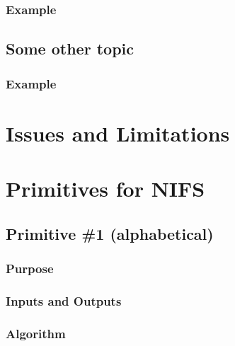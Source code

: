 \documentclass[letterpaper,10pt,english]{sphinxmanual}
\begin{document}
\subsubsection{Example}
\label{NIFS/tipstricks:example}

\subsection{Some other topic}
\label{NIFS/tipstricks:some-other-topic}

\subsubsection{Example}
\label{NIFS/tipstricks:id1}

\section{Issues and Limitations}
\label{NIFS/issueslimitations:nifs-issues-limitations}\label{NIFS/issueslimitations::doc}\label{NIFS/issueslimitations:issues-and-limitations}

\section{Primitives for NIFS}
\label{NIFS/primitives:primitives-for-nifs}\label{NIFS/primitives:nifs-primitives}\label{NIFS/primitives::doc}

\subsection{Primitive \#1  (alphabetical)}
\label{NIFS/primitives_pages/primitive1:nifs-primitive-1}\label{NIFS/primitives_pages/primitive1:primitive-1-alphabetical}\label{NIFS/primitives_pages/primitive1::doc}

\subsubsection{Purpose}
\label{NIFS/primitives_pages/primitive1:purpose}

\subsubsection{Inputs and Outputs}
\label{NIFS/primitives_pages/primitive1:inputs-and-outputs}

\subsubsection{Algorithm}
\label{NIFS/primitives_pages/primitive1:algorithm}
\end{document}
